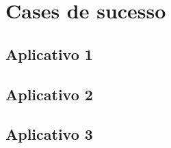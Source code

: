 
\chapter{Cases de sucesso}
\label{cap:caseSucesso}





\section{Aplicativo 1}




\section{Aplicativo 2}




\section{Aplicativo 3}

